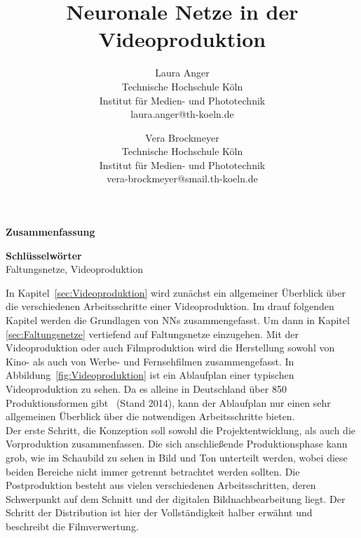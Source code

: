\documentclass[times, 12pt,twocolumn]{article}
\begin{document}
\title{Neuronale Netze in der Videoproduktion}

\author{Laura Anger\\
Technische Hochschule K\"oln \\ Institut f\"ur Medien- und Phototechnik \\  laura.anger@th-koeln.de \\
\and
Vera Brockmeyer\\
Technische Hochschule K\"oln \\ Institut f\"ur Medien- und Phototechnik \\ vera-brockmeyer@smail.th-koeln.de \\
}

\maketitle
\thispagestyle{empty}


\large{\textbf{Zusammenfassung}}\\ \small %
{} 

\large{\textbf{Schl\"usselw\"orter}}\\ \small %
 Faltungsnetze, Videoproduktion


 \label{sec:Einleitung}

 \label{sec:Grundlagen}
In Kapitel~\ref{sec:Videoproduktion} wird zunächst ein allgemeiner Überblick über die verschiedenen Arbeitsschritte einer Videoproduktion. Im drauf folgenden Kapitel werden die Grundlagen von NNs zusammengefasst. Um dann in Kapitel \ref{sec:Faltungsnetze} vertiefend auf Faltungsnetze einzugehen. 
 \label{sec:Videoproduktion}
Mit der Videoproduktion oder auch Filmproduktion wird die Herstellung sowohl von Kino- als auch von Werbe- und Fernsehfilmen zusammengefasst. In Abbildung~\ref{fig:Videoproduktion} ist ein Ablaufplan einer typischen Videoproduktion zu sehen. Da es alleine in Deutschland über 850 Produktionsformen gibt~\cite{formatt} (Stand 2014), kann der Ablaufplan nur einen sehr allgemeinen Überblick über die notwendigen Arbeitsschritte bieten. \\
Der erste Schritt, die Konzeption soll sowohl die Projektentwicklung, als auch die Vorproduktion zusammenfassen. Die sich anschließende Produktionsphase kann grob, wie im Schaubild zu sehen in Bild und Ton unterteilt werden, wobei diese beiden Bereiche nicht immer getrennt betrachtet werden sollten. Die Postproduktion besteht aus vielen verschiedenen Arbeitsschritten, deren Schwerpunkt auf dem Schnitt und der digitalen Bildnachbearbeitung liegt. Der Schritt der Distribution ist hier der Vollständigkeit halber erwähnt und beschreibt die Filmverwertung. \\
\end{document}
